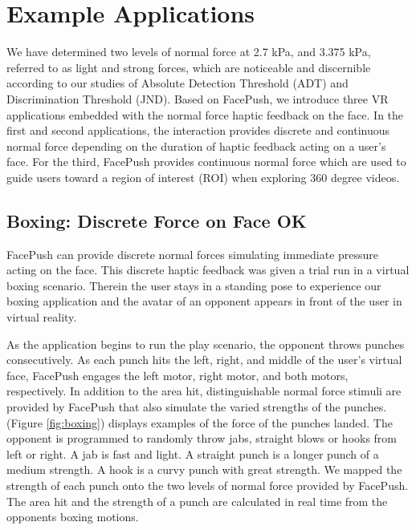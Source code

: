 \chapter{Example Applications} \label{chapter:interaction_techniques}
We have determined two levels of normal force at 2.7 kPa, and 3.375 kPa, referred to as light and strong forces, which are noticeable and discernible according to our studies of Absolute Detection Threshold (ADT) and Discrimination Threshold (JND). Based on FacePush, we introduce three VR applications embedded with the normal force haptic feedback on the face. In the first and second applications, the interaction provides discrete and continuous normal force depending on the duration of haptic feedback acting on a user's face. For the third, FacePush provides continuous normal force which are used to guide users toward a region of interest (ROI) when exploring 360 degree videos. 

\section{Boxing: Discrete Force on Face OK}

FacePush can provide discrete normal forces simulating immediate pressure acting on the face. This discrete haptic feedback was given a trial run in a virtual boxing scenario. Therein the user stays in a standing pose to experience our boxing application and the avatar of an opponent appears in front of the user in virtual reality.

As the application begins to run the play scenario, the opponent throws punches consecutively. As each punch hits the left, right, and middle of the user's virtual face, FacePush engages the left motor, right motor, and both motors, respectively. In addition to the area hit, distinguishable normal force stimuli are provided by FacePush that also simulate the varied strengths of the punches. (Figure \ref{fig:boxing}) displays examples of the force of the punches landed. The opponent is programmed to randomly throw jabs, straight blows or hooks from left or right. A jab is fast and light. A straight punch is a longer punch of a medium strength. A hook is a curvy punch with great strength. We mapped the strength of each punch onto the two levels of normal force provided by FacePush. The area hit and the strength of a punch are calculated in real time from the opponents boxing motions. 


